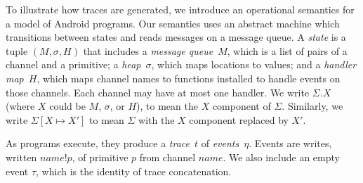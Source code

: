 \documentclass{llncs}
\newcommand{\sch}{\textit{name}}
\newcommand{\tr}{t\xspace}
\newcommand{\evt}{\eta}
\begin{document}
To illustrate how traces are generated, we introduce an operational
semantics for a model of Android programs.  Our semantics uses an
abstract machine which transitions between states and reads messages
on a message queue.  A \emph{state} is a tuple $(M, \sigma, H)$ that
includes a \emph{message queue}~$M$, which is a list of pairs of a channel and a primitive; a
\emph{heap}~$\sigma$, which maps locations to values; and a \emph{handler
  map}~$H$, which maps channel names to functions installed to
handle events on those channels. Each channel may have at most one handler.
We write $\Sigma.X$ (where $X$ could be $M$,
$\sigma$, or $H$), to mean the $X$ component of
$\Sigma$. Similarly, we write $\Sigma[X\mapsto X']$ to mean $\Sigma$
with the $X$ component replaced by $X'$.

As programs execute, they produce a \emph{trace}~$\tr$ of 
\emph{events}~$\evt$. Events are writes,
written $\sch ! p$, of primitive $p$ from channel $\sch$. We also include an empty event
$\tau$, which is the identity of trace concatenation.
\end{document}
